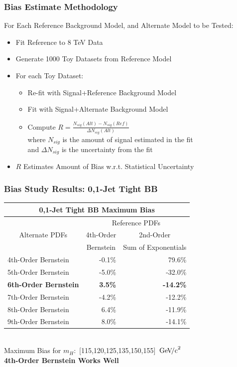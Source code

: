 \documentclass{beamer}
\newcommand{\GeVcc}{\ensuremath{\,\mathrm{Ge\kern -0.1em V\!/c}^2}}
\begin{document}
\begin{frame}[label=biasEstimateMethod]
\frametitle{Bias Estimate Methodology}
  For Each Reference Background Model, and Alternate Model to be Tested:
  \begin{itemize}
    \item Fit Reference to 8 TeV Data
    \item Generate 1000 Toy Datasets from Reference Model
    \item For each Toy Dataset:
    \begin{itemize}
        \item Re-fit with Signal+Reference Background Model
        \item Fit with Signal+Alternate Background Model
        \item Compute $R = \frac{N_{sig}(Alt)-N_{sig}(Ref)}{\Delta N_{sig}(Alt)}$
            \\ where $N_{sig}$ is the amount of signal estimated in the fit
            \\ and $\Delta N_{sig}$ is the uncertainty from the fit
    \end{itemize}
    \item $R$ Estimates Amount of Bias w.r.t. Statistical Uncertainty
  \end{itemize}
\end{frame}

\begin{frame}
\frametitle{Bias Study Results: 0,1-Jet Tight BB}
\scriptsize
\begin{center}
\begin{tabular}{|l|r|r|} \hline 
\multicolumn{3}{|c|}{ \bf 0,1-Jet Tight BB Maximum Bias} \\ \hline
\multicolumn{1}{|c|}{\multirow{3}{*}{Alternate PDFs}} & \multicolumn{2}{c|}{Reference PDFs} \\ \cline{2-3} 
& \multicolumn{1}{c|}{4th-Order} & \multicolumn{1}{c|}{2nd-Order} \\ 
& \multicolumn{1}{c|}{      Bernstein} & \multicolumn{1}{c|}{Sum of Exponentials} \\ \hline
4th-Order Bernstein &           -0.1\% &           79.6\% \\ \hline
5th-Order Bernstein &           -5.0\% &          -32.0\% \\ \hline
\textbf{6th-Order Bernstein} &            \textbf{3.5\%} &          \textbf{-14.2\%} \\ \hline
7th-Order Bernstein &           -4.2\% &          -12.2\% \\ \hline
8th-Order Bernstein &            6.4\% &          -11.9\% \\ \hline
9th-Order Bernstein &            8.0\% &          -14.1\% \\ \hline
\end{tabular}
\small
\\ \vspace{1em}
Maximum Bias for $m_H:$ [115,120,125,135,150,155] \GeVcc{}
\\
\bf
4th-Order Bernstein Works Well
\end{center}
\end{frame}
\end{document}
